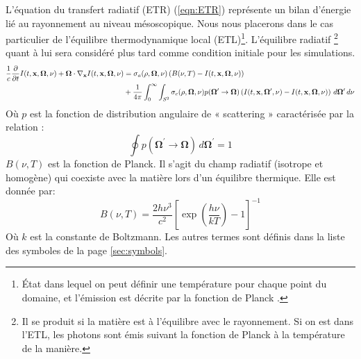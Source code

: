 L'équation du transfert radiatif (ETR) (\ref{eqn:ETR}) représente un bilan d'énergie lié au rayonnement au niveau mésoscopique. Nous nous placerons dans le cas particulier de l'équilibre thermodynamique local (ETL)\footnote{État dans lequel on peut définir une température pour chaque point du domaine, et l'émission est décrite par la fonction de Planck \parencite{Reference3}.}. L'équilibre radiatif \footnote{Il se produit si la matière est à l'équilibre avec le rayonnement. Si on est dans l'ETL, les photons sont émis suivant la fonction de Planck à la température de la manière.} quant à lui sera considéré plus tard comme condition initiale pour les simulations.
\begingroup
\footnotesize
\begin{gather}
    \begin{aligned}
    \frac{1}{c} \frac{\partial}{\partial t}I(t,\mathbf{x},\bm{\Omega},\nu)+\bm{\Omega}\cdot\nabla_{\mathbf{x}} I(t,\mathbf{x},\bm{\Omega},\nu)
    &= \sigma_a(\rho,\bm{\Omega},\nu)\left(B(\nu,T)-I(t,\mathbf{x},\bm{\Omega},\nu)\right) \\
    &+ \frac{1}{4\pi} \int_{0}^{\infty} \int_{S^2}\sigma_c(\rho,\bm{\Omega},\nu)p(\bm{\Omega}^\prime\rightarrow\bm{\Omega})\left(I(t,\mathbf{x},\bm{\Omega}^\prime,\nu)-I(t,\mathbf{x},\bm{\Omega},\nu)\right) \, d\bm{\Omega}^\prime \, d\nu
    \end{aligned}
\label{eqn:ETR}
\end{gather}
\endgroup
Où $p$ est la fonction de distribution angulaire de « scattering » caractérisée par la relation : $$\oint p(\bm{\Omega}^\prime\rightarrow\bm{\Omega})\, d\bm{\Omega}^\prime=1$$
$B(\nu, T)$ est la fonction de Planck. Il s'agit du champ radiatif (isotrope et homogène) qui coexiste avec la matière lors d'un équilibre thermique. Elle est donnée par: $$ B(\nu,T)=\dfrac{2h\nu^3}{c^2} \left[ \operatorname{exp}(\dfrac{h\nu}{kT}) - 1 \right]^{-1} $$ 
Où $k$ est la constante de Boltzmann. Les autres termes sont définis dans la liste des symboles de la page \ref{sec:symbols}.

